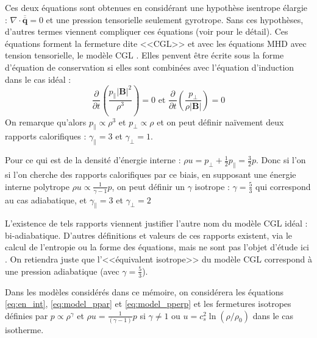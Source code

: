 Ces deux équations sont obtenues en considérant une hypothèse isentrope élargie : $\nabla \cdot \overline{\overline{\mathbf{q}}} = 0$ et une pression tensorielle seulement gyrotrope. Sans ces hypothèses, d'autres termes viennent compliquer ces équations (voir \cite{hunana_introductory_2019} pour le détail). Ces équations forment la fermeture dite <<CGL>> et avec les équations MHD avec tension tensorielle, le modèle CGL \cite{chew_boltzmann_1956}. 
Elles penvent être écrite sous la forme d'équation de conservation si elles sont combinées avec l'équation d'induction dans le cas idéal : 
\begin{equation}
\frac{\partial }{\partial t}( \frac{p_{\parallel}|\mathbf{B}|^2}{\rho^3} ) = 0 \textrm{ et } \frac{\partial }{\partial t}( \frac{p_{\perp}}{\rho |\mathbf{B}|}) = 0 
\end{equation}
On remarque qu'alors $p_{\parallel} \propto \rho^3$ et $p_{\perp} \propto \rho$ et on peut définir naïvement deux rapports calorifiques : $\gamma_{\parallel}  = 3$ et $\gamma_{\perp} =1$.

Pour ce qui est de la densité d'énergie interne : $\rho u =  p_{\perp} + \frac{1}{2} p_{\parallel} = \frac{3}{2} p$. Donc si l'on si l'on cherche des rapports calorifiques par ce biais, en supposant une énergie interne polytrope $\rho u \propto \frac{1}{\gamma-1} p$, on peut définir un $\gamma$ isotrope : $\gamma = \frac{5}{3}$ qui correspond au cas adiabatique, et $\gamma_{\parallel}  = 3$ et $\gamma_{\perp} = 2$

L'existence de tels rapports viennent justifier l'autre nom du modèle CGL idéal : bi-adiabatique.  D'autres définitions et valeurs de ces rapports existent, via le calcul de l'entropie ou la forme des équations, mais ne sont pas l'objet d'étude ici \cite{hunana_introductory_2019}. On retiendra juste que l'<<équivalent isotrope>> du modèle CGL correspond à une pression adiabatique (avec $\gamma = \frac{5}{3}$). 

Dans les modèles considérés dans ce mémoire, on considérera les équations \ref{eq:en_int}, \ref{eq:model_ppar} et \ref{eq:model_pperp} et les fermetures isotropes définies par $p \propto \rho^{\gamma}$ et $ \rho u = \frac{1}{(\gamma-1)} p $ si $\gamma \neq 1$ ou  $u = c_s^2 \ln(\rho/\rho_0)$ dans le cas isotherme.

